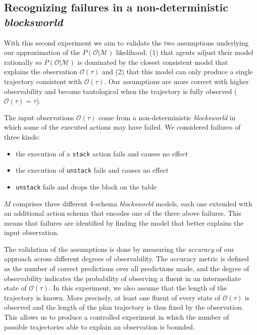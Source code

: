 \documentclass[letterpaper]{article} %
\begin{document}
\subsection{Recognizing failures in a non-deterministic {\em blocksworld}}
With this second experiment we aim to validate the two assumptions underlying our approximation of the $P(\mathcal{O}|\mathcal{M})$ likelihood: (1) that agents adjust their model rationally so $P(\mathcal{O}|\mathcal{M})$ is dominated by the closest consistent model that explains the observation $\mathcal{O}(\tau)$ and (2) that this model can only produce a single trajectory consistent with $\mathcal{O}(\tau)$. Our assumptions are more correct with higher observability and become tautological when the trajectory is fully observed ($\mathcal{O(\tau)} = \tau$).

The input observations $\mathcal{O}(\tau)$ come from a non-deterministic {\em blocksworld} in which some of the executed actions may have failed. We considered failures of three kinds:

\begin{itemize}
	\item the execution of a {\tt\small stack} action fails and causes no effect
	\item the execution of {\tt\small unstack} fails and causes no effect
	\item {\tt\small unstack} fails and drops the block on the table
\end{itemize}

$M$ comprises three different 4-schema {\em blocksworld} models, each one extended with an additional action schema that encodes one of the three above failures. This means that failures are identified by finding the model that better explains the input observation.


The validation of the assumptions is done by measuring the {\em  accuracy} of our approach across different degrees of observability. The accuracy metric is defined as the number of correct predictions over all predictions made, and the degree of observability indicates the probability of observing a fluent in an intermediate state of $\mathcal{O}(\tau)$. In this experiment, we also assume that the length of the trajectory is known. More precisely, at least one fluent of every state of $\mathcal{O}(\tau)$ is observed and the length of the plan trajectory is thus fixed by the observation. This allows us to produce a controlled experiment in which the number of possible trajectories able to explain an observation is bounded.
\end{document}
